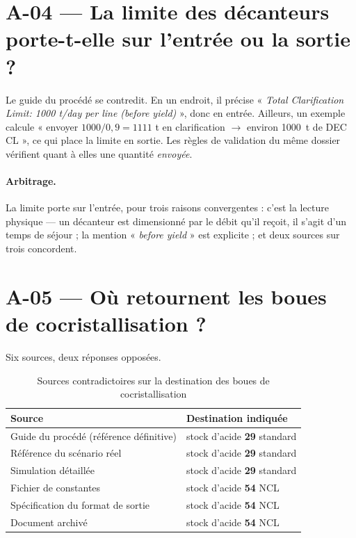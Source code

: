 \section{A-04 --- La limite des décanteurs porte-t-elle sur l'entrée ou la sortie ?}

Le guide du procédé se contredit. En un endroit, il précise
« \emph{Total Clarification Limit: 1000 t/day per line (before yield)} », donc en entrée.
Ailleurs, un exemple calcule « envoyer $1000/0{,}9 = 1111$ t en clarification $\to$ environ
\SI{1000}{\tonne} de DEC CL », ce qui place la limite en sortie. Les règles de validation du
même dossier vérifient quant à elles une quantité \emph{envoyée}.

\paragraph{Arbitrage.} La limite porte sur l'entrée, pour trois raisons convergentes :
c'est la lecture physique --- un décanteur est dimensionné par le débit qu'il reçoit, il
s'agit d'un temps de séjour ; la mention « \emph{before yield} » est explicite ; et deux
sources sur trois concordent.

\section{A-05 --- Où retournent les boues de cocristallisation ?}

Six sources, deux réponses opposées.

\begin{table}[H]
\centering
\caption{Sources contradictoires sur la destination des boues de cocristallisation}
\label{tab:boues-coc}
\begin{tabular}{@{}ll@{}}
\toprule
\textbf{Source} & \textbf{Destination indiquée} \\
\midrule
Guide du procédé (référence définitive) & stock d'acide \textbf{29} standard \\
Référence du scénario réel & stock d'acide \textbf{29} standard \\
Simulation détaillée & stock d'acide \textbf{29} standard \\
Fichier de constantes & stock d'acide \textbf{54} NCL \\
Spécification du format de sortie & stock d'acide \textbf{54} NCL \\
Document archivé & stock d'acide \textbf{54} NCL \\
\bottomrule
\end{tabular}
\end{table}

